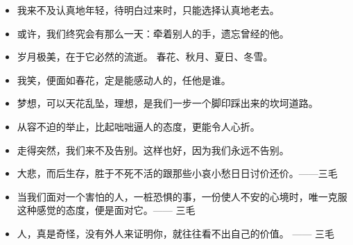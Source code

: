 \documentclass[UTF8,a4paper,8pt]{ctexart}
\begin{document}
\begin{itemize}
 	\item 我来不及认真地年轻，待明白过来时，只能选择认真地老去。
 	
 	\item 或许，我们终究会有那么一天：牵着别人的手，遗忘曾经的他。
 	
 	\item 岁月极美，在于它必然的流逝。 春花、秋月、夏日、冬雪。
 	
 	\item 我笑，便面如春花，定是能感动人的，任他是谁。
 	
 	\item 梦想，可以天花乱坠，理想，是我们一步一个脚印踩出来的坎坷道路。
 	
 	\item 从容不迫的举止，比起咄咄逼人的态度，更能令人心折。
 	
 	\item 走得突然，我们来不及告别。这样也好，因为我们永远不告别。
 	
 	\item 大悲，而后生存，胜于不死不活的跟那些小哀小愁日日讨价还价。——三毛
 	
 	\item 当我们面对一个害怕的人，一桩恐惧的事，一份使人不安的心境时，唯一克服这种感觉的态度，便是面对它。—— 三毛
 	
 	\item 人，真是奇怪，没有外人来证明你，就往往看不出自己的价值。 —— 三毛
 \end{itemize}
 
\end{document}
